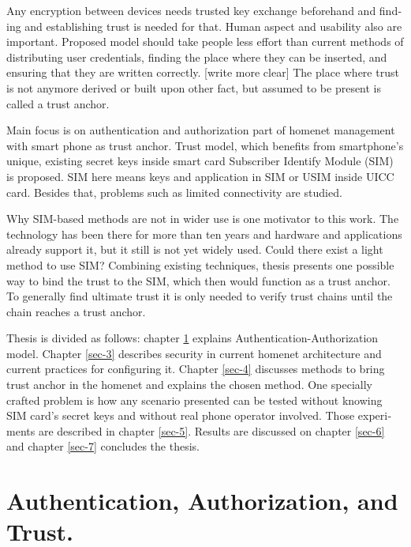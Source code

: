 \documentclass[12pt,a4paper,english]{tutthesis}
\begin{document}
\begin{otherlanguage}{english}
Any encryption between devices needs trusted key exchange
beforehand and finding and establishing trust is needed for that.
Human aspect and usability also are important. Proposed model should
take people less effort than current methods of distributing user
credentials, finding the place where they can be inserted, and
ensuring that they are written correctly. [write more clear]
The place where trust is not anymore derived or built upon other 
fact, but assumed to be present is called a trust anchor.

Main focus is on authentication and authorization part of
homenet management with smart phone as trust anchor.
Trust model, which benefits from smartphone's unique,
existing secret keys inside smart card Subscriber Identify Module
(SIM) is proposed. 
SIM here means keys and application in SIM or USIM inside UICC card. 
Besides that, problems such as limited connectivity are studied. 


Why SIM-based methods are not in wider use is one motivator to this
work.  The technology has been there for more than ten years and
hardware and applications already support it, but it still is not yet
widely used.  Could there exist a light method to use SIM?  Combining
existing techniques, thesis presents one possible way to bind the
trust to the SIM, which then would function as a trust anchor. To
generally find ultimate trust it is only needed to verify trust chains
until the chain reaches a trust anchor.




Thesis is divided as follows: chapter \ref{sec-2} explains Authentication-Authorization model.
Chapter \ref{sec-3} describes security in current homenet architecture and 
current practices for configuring it.
 Chapter \ref{sec-4}
discusses methods to bring trust anchor in the homenet and explains
the chosen method.
One specially crafted problem is how any scenario presented can be
tested without knowing SIM card's secret keys and without real phone
operator involved.  Those experiments are described in chapter
\ref{sec-5}.
Results are discussed on chapter  \ref{sec-6} and chapter \ref{sec-7} concludes the
thesis.
\chapter{Authentication, Authorization, and Trust.}
\label{sec-2}


\end{otherlanguage}
\end{document}
